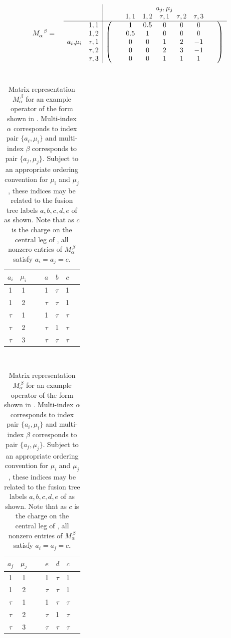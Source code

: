 \documentclass[aps,prb,reprint,superscriptaddress,amsfonts,amsmath,amssymb,showpacs,floatfix]{revtex4-1}
\newcommand{\fref}[1]{Fig.~\ref{#1}}
\newcommand{\p}[1]{\phantom{#1}}
\newcommand{\Mop}{M_\alpha^{\p{\alpha}\beta}}
\begin{document}
\begin{table}
\begin{equation*}
\Mop=\quad\begin{array}{cc|ccccccc}
&&&\multicolumn{5}{c}{a_j,\mu_j}&\\
&&&1,1&1,2&\tau,1&\tau,2&\tau,3&\\
\hline
\multirow{5}{*}{$a_i$,$\mu_i$}&1,1&
\multirow{5}{*}{$\left(\begin{array}{c}\!\\ \!\\ \!\\ \!\\ \!\end{array}\right.$}& 1&0.5&0&0&0 &
\multirow{5}{*}{$\left.\begin{array}{c}\!\\ \!\\ \!\\ \!\\ \!\end{array}\right)$}\\
&1,2&& 0.5&1&0&0&0 &\\
&\tau,1&& 0&0&1&2&-1 &\\
&\tau,2&& 0&0&2&3&-1 &\\
&\tau,3&& 0&0&1&1&1 &
\end{array}
\end{equation*}
~

\begin{tabular}{|cc|ccccc|}
\hline
$a_i$&$\mu_i$&~&$a$&$b$&$c$&\\
\hline\hline
1&1&&1&$\tau$&1&\\
1&2&&$\tau$&$\tau$&1&\\
$\tau$&1&&1&$\tau$&$\tau$&\\
$\tau$&2&&$\tau$&1&$\tau$&\\
$\tau$&3&&$\tau$&$\tau$&$\tau$&\\
\hline
\end{tabular}
~~~~
\begin{tabular}{|cc|ccccc|}
\hline
$a_j$&$\mu_j$&~&$e$&$d$&$c$&\\
\hline\hline
1&1&&1&$\tau$&1&\\
1&2&&$\tau$&$\tau$&1&\\
$\tau$&1&&1&$\tau$&$\tau$&\\
$\tau$&2&&$\tau$&1&$\tau$&\\
$\tau$&3&&$\tau$&$\tau$&$\tau$&\\
\hline
\end{tabular}
\caption{Matrix representation $M_\alpha^{~\beta}$ for an example operator of the form shown in \protect{\fref{fig:exampleoperator}}. Multi-index $\alpha$ corresponds to index pair $\{a_i,\mu_i\}$ and multi-index $\beta$ corresponds to pair $\{a_j,\mu_j\}$. Subject to an appropriate ordering convention for $\mu_i$ and $\mu_j$, these indices may be related to the fusion tree labels $a,b,c,d,e$ of \protect{\fref{fig:exampleoperator}} as shown. Note that as $c$ is the charge on the central leg of \protect{\fref{fig:exampleoperator}}, all nonzero entries of $M_\alpha^{~\beta}$ satisfy $a_i=a_j=c$.\label{tab:examplematrix}}
\end{table}
\end{document}
